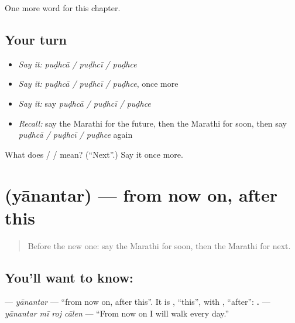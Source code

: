 \begin{grammarlens}[title={What you've built}]
One more word for this chapter.
\end{grammarlens}

\subsection*{Your turn}
\begin{itemize}
\raggedright
  \item \emph{Say it:} \emph{puḍhcā / puḍhcī / puḍhce}
  \item \emph{Say it:} \emph{puḍhcā / puḍhcī / puḍhce}, once more
  \item \emph{Say it:} say \emph{puḍhcā / puḍhcī / puḍhce}
  \item \emph{Recall:} say the Marathi for the future, then the Marathi for soon, then say \emph{puḍhcā / puḍhcī / puḍhce} again
\end{itemize}

\begin{tcolorbox}[breakable,colback=teal!4,colframe=teal!35!black,title={Before you move on}]
What does  /  /  mean? (\textquotedblleft{}Next\textquotedblright{}.) Say it once more.
\end{tcolorbox}
\section[\texorpdfstring{\mr{यानंतर} (yānantar)}{यानंतर (yānantar)}]{ (yānantar) — from now on, after this}

\label{lesson:MR-C160-yanantar}



\begin{quote}
Before the new one: say the Marathi for soon, then the Marathi for next.
\end{quote}

\subsection*{You'll want to know: }
\textbf{} — \emph{yānantar} — \textquotedblleft{}from now on, after this\textquotedblright{}. It is \textbf{}, \textquotedblleft{}this\textquotedblright{}, with \textbf{}, \textquotedblleft{}after\textquotedblright{}: \textbf{   .} — \emph{yānantar mī roj cālen} — \textquotedblleft{}From now on I will walk every day.\textquotedblright{}

